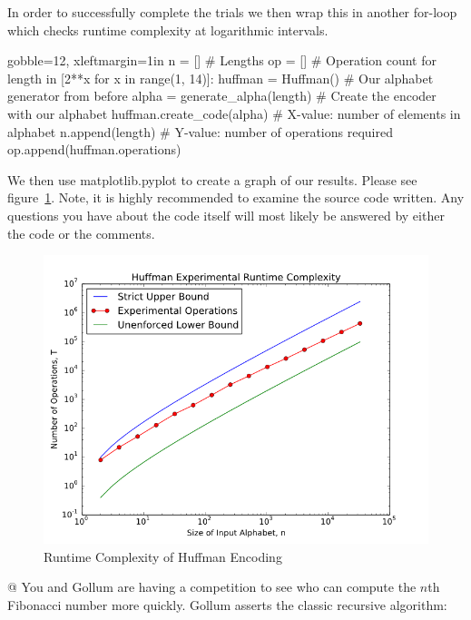 \documentclass[10pt]{article}
\begin{document}
\begin{easylist}[enumerate]
    In order to successfully complete the trials we then wrap this in another {\ttfamily for}-loop which checks runtime
    complexity at logarithmic intervals.

        \begin{pythoncode*}{gobble=12, xleftmargin=1in}
            n  = []  # Lengths
            op = []  # Operation count
            for length in [2**x for x in range(1, 14)]:
                huffman = Huffman()
                # Our alphabet generator from before
                alpha = generate_alpha(length)
                # Create the encoder with our alphabet
                huffman.create_code(alpha)
                # X-value: number of elements in alphabet
                n.append(length)
                # Y-value: number of operations required
                op.append(huffman.operations)
        \end{pythoncode*}

    We then use {\ttfamily matplotlib.pyplot} to create a graph of our results. Please see figure~\ref{fig:complex}.
    Note, it is highly recommended to examine the source code written. Any questions you have about the code itself will
    most likely be answered by either the code or the comments.

        \begin{figure}[!ht]
            \centering
            \includegraphics[scale=0.75]{./img/complexity.png}
            \caption{Runtime Complexity of Huffman Encoding}
            \label{fig:complex}
        \end{figure}

    @ You and Gollum are having a competition to see who can compute the $n$th Fibonacci number more quickly. Gollum
    asserts the classic recursive algorithm:


\end{easylist}
\end{document}
